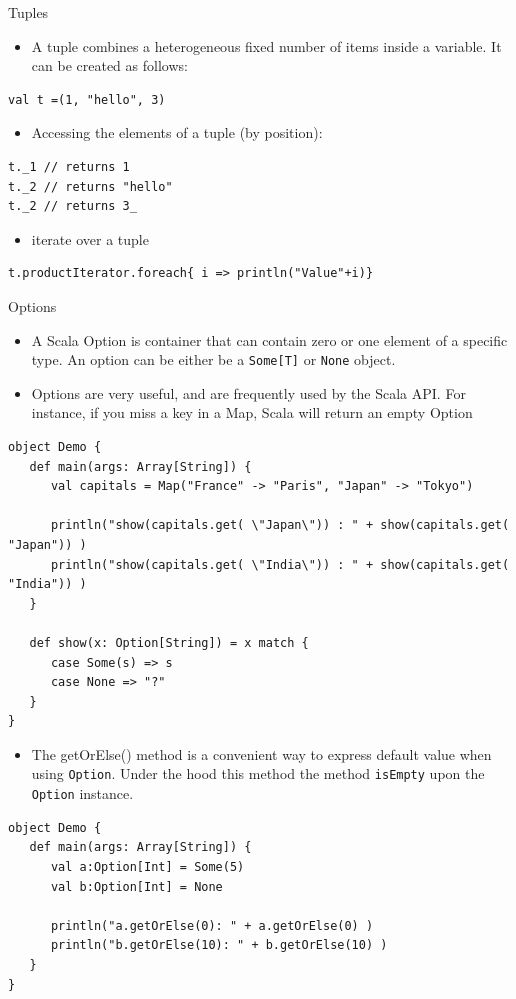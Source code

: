 \documentclass[presentation, aspectratio=169]{beamer}
\begin{document}
\begin{frame}[fragile,allowframebreaks,label=]{Tuples}
 \begin{itemize}
\item A tuple combines a heterogeneous fixed number of items inside a variable.
It can be created as follows:
\end{itemize}
\tiny
\begin{verbatim}
val t =(1, "hello", 3)
\end{verbatim}
\large
\begin{itemize}
\item Accessing the elements of a tuple (by position):
\end{itemize}
\tiny
\begin{verbatim}
t._1 // returns 1
t._2 // returns "hello"
t._2 // returns 3_
\end{verbatim}
\large
\begin{itemize}
\item iterate over a tuple
\end{itemize}
\tiny
\begin{verbatim}
t.productIterator.foreach{ i => println("Value"+i)}
\end{verbatim}
\end{frame}

\begin{frame}[fragile,allowframebreaks,label=]{Options}
 \begin{itemize}
\item A Scala Option is container that can contain zero or one element of a specific type.
An option can be either be a \texttt{Some[T]} or \texttt{None} object.
\item Options are very useful, and are frequently used by the Scala API. For instance, if you miss
a key in a Map, Scala will return an empty Option
\end{itemize}
\tiny
\begin{verbatim}
object Demo {
   def main(args: Array[String]) {
      val capitals = Map("France" -> "Paris", "Japan" -> "Tokyo")

      println("show(capitals.get( \"Japan\")) : " + show(capitals.get( "Japan")) )
      println("show(capitals.get( \"India\")) : " + show(capitals.get( "India")) )
   }

   def show(x: Option[String]) = x match {
      case Some(s) => s
      case None => "?"
   }
}
\end{verbatim}
\large
\begin{itemize}
\item The getOrElse() method is a convenient way to express default value when using \texttt{Option}.
Under the hood this method the method \texttt{isEmpty} upon the \texttt{Option} instance.
\end{itemize}
\tiny
\begin{verbatim}
object Demo {
   def main(args: Array[String]) {
      val a:Option[Int] = Some(5)
      val b:Option[Int] = None 

      println("a.getOrElse(0): " + a.getOrElse(0) )
      println("b.getOrElse(10): " + b.getOrElse(10) )
   }
}
\end{verbatim}
\end{frame}
\end{document}
